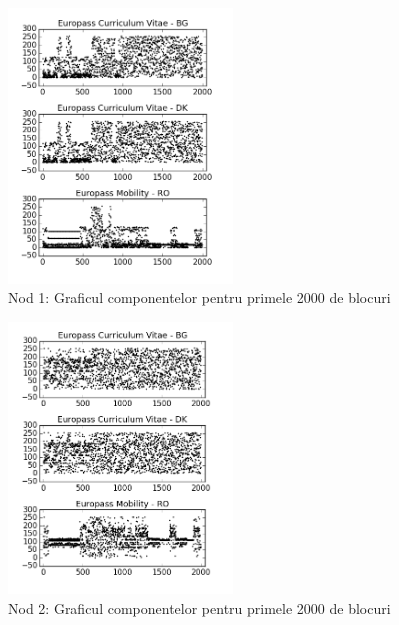 \documentclass[oneside, 12pt]{book}
\begin{document}
\begin{figure}[b!]
\begin{center}{}
\includegraphics[width=0.53\textwidth]{img/db1.png}    %
\caption{Nod 1: Graficul componentelor pentru primele 2000 de blocuri} 
\label{fig:db1}
\end{center}
\end{figure}



\begin{figure}[t!]
\begin{center}
\includegraphics[width=0.53\textwidth]{img/db2.png}    %
\caption{Nod 2: Graficul componentelor pentru primele 2000 de blocuri} 
\label{fig:db2}
\end{center}
\end{figure}
\end{document}
